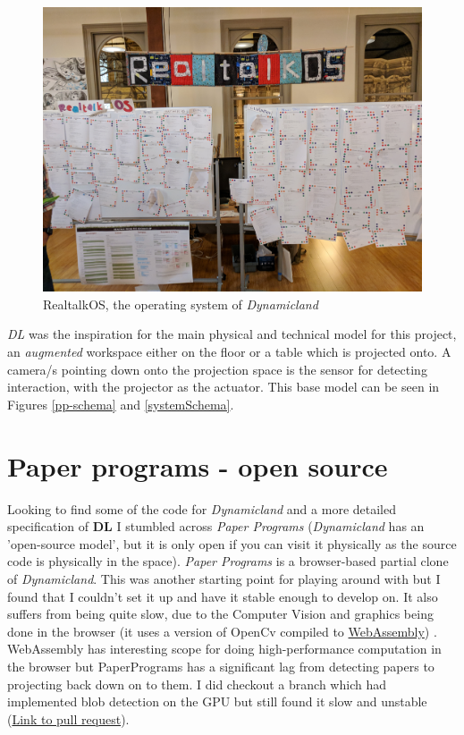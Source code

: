 \documentclass[12pt]{report}
\begin{document}
\begin{figure}[htbp]
\centering
\includegraphics[width=12cm]{assets/realtalk-os.jpg}
\caption{RealtalkOS, the operating system of \emph{Dynamicland}}
\end{figure}  


\emph{DL} was the inspiration for the main physical and technical model for
this project, an \emph{augmented} workspace either on the floor or a table which is
projected onto. A camera/s pointing down onto the projection space is the sensor
for detecting interaction, with the projector as the actuator. This base model can be
seen in Figures \ref{pp-schema} and  \ref{systemSchema}.

\section{Paper programs - open source}
\label{sec:org48ccc57}

Looking to find some of the code for \emph{Dynamicland} and a more detailed
specification of \textbf{DL} I stumbled across \emph{Paper Programs} (\emph{Dynamicland} has an
'open-source model', but it is only open if you can visit it physically as the
source code is physically in the space). \emph{Paper Programs} is a browser-based
partial clone of \emph{Dynamicland}. This was another starting point for playing
around with but I found that I couldn't set it up and have it stable enough to
develop on. It also suffers from being quite slow, due to the Computer Vision
and graphics being done in the browser (it uses a version of OpenCv compiled to
\href{https://webassembly.org/}{WebAssembly}) \cite{JpPaperPrograms}. WebAssembly has interesting scope for doing
high-performance computation in the browser but PaperPrograms has a significant
lag from detecting papers to projecting back down on to them. I did checkout a
branch which had implemented blob detection on the GPU but still found it slow
and unstable (\href{https://github.com/janpaul123/paperprograms/pull/28}{Link to pull request}).
\end{document}
